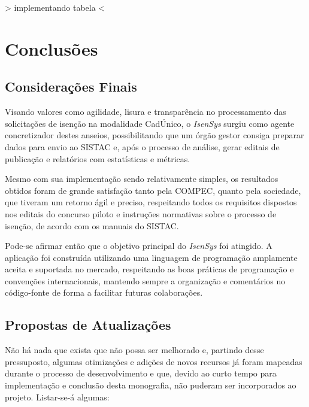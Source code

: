 \documentclass[
	12pt,			%
	openright,		%
	oneside,	
	a4paper,		%
	english,		%
	brazil			%
]{abntex2/abntex2}  %
\begin{document}
	{\textgreater} implementando tabela {\textless}

	\chapter{Conclusões}
	
		\section{Considerações Finais}
	
			Visando valores como agilidade, lisura e transparência no processamento das solicitações de isenção na modalidade CadÚnico, o \textit{IsenSys} surgiu como agente concretizador destes anseios, possibilitando que um órgão gestor consiga preparar dados para envio ao SISTAC e, após o processo de análise, gerar editais de publicação e relatórios com estatísticas e métricas.
			
			Mesmo com sua implementação sendo relativamente simples, os resultados obtidos foram de grande satisfação tanto pela COMPEC, quanto pela sociedade, que tiveram um retorno ágil e preciso, respeitando todos os requisitos dispostos nos editais do concurso piloto e instruções normativas sobre o processo de isenção, de acordo com os manuais do SISTAC.
			
			Pode-se afirmar então que o objetivo principal do \textit{IsenSys} foi atingido. A aplicação foi construída utilizando uma linguagem de programação amplamente aceita e suportada no mercado, respeitando as boas práticas de programação e convenções internacionais, mantendo sempre a organização e comentários no código-fonte de forma a facilitar futuras colaborações.
	
		\section{Propostas de Atualizações}
		
			Não há nada que exista que não possa ser melhorado e, partindo desse pressuposto, algumas otimizações e adições de novos recursos já foram mapeadas durante o processo de desenvolvimento e que, devido ao curto tempo para implementação e conclusão desta monografia, não puderam ser incorporados ao projeto. Listar-se-á algumas:
			
\end{document}
